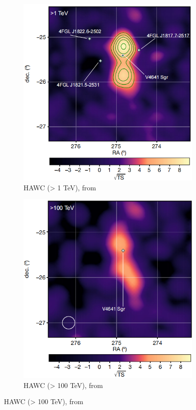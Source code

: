 \documentclass[10pt,aspectratio=169,mathserif]{beamer}
\begin{document}
\begin{frame}
\begin{itemize}
\begin{figure}[ht]
\begin{subfigure}[t]{0.30\linewidth}
        \includegraphics[width=\linewidth]{HAWC4641_1.png}
        \caption{HAWC (> 1 TeV), from \cite{alfaro2024ultra}}
        \label{fig:sub2}
    \end{subfigure}%
    \hfill
    \begin{subfigure}[t]{0.30\linewidth}
        \includegraphics[width=\linewidth]{HAWC4641_2.png}
        \caption{HAWC (> 100 TeV), from \cite{alfaro2024ultra}}
        \label{fig:sub3}
    \end{subfigure}
    \label{fig:subcaption-align}
\end{figure}


\end{itemize}
\end{frame}
\end{document}
